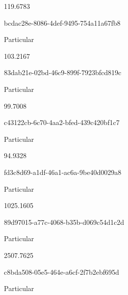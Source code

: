 \documentclass[
  11pt,
  a4paper,
  DIV=11,
  numbers=noendperiod]{scrartcl}
\begin{document}
\n      

119.6783

\n    

\n    

\n      

bcdac28e-8086-4def-9495-754a11a67fb8

\n      

Particular

\n      

103.2167

\n    

\n    

\n      

83dab21e-02bd-46c9-899f-7923bfcd819c

\n      

Particular

\n      

99.7008

\n    

\n    

\n      

c43122cb-6c70-4aa2-bfed-439c420bf1c7

\n      

Particular

\n      

94.9328

\n    

\n    

\n      

fd3c8d69-a1df-46a1-ac6a-9be40d0029a8

\n      

Particular

\n      

1025.1605

\n    

\n    

\n      

89d97015-a77c-4068-b35b-d069c54d1c2d

\n      

Particular

\n      

2507.7625

\n    

\n    

\n      

c8bda508-05e5-464e-a6cf-2f7b2ebf695d

\n      

Particular

\n      
\end{document}
